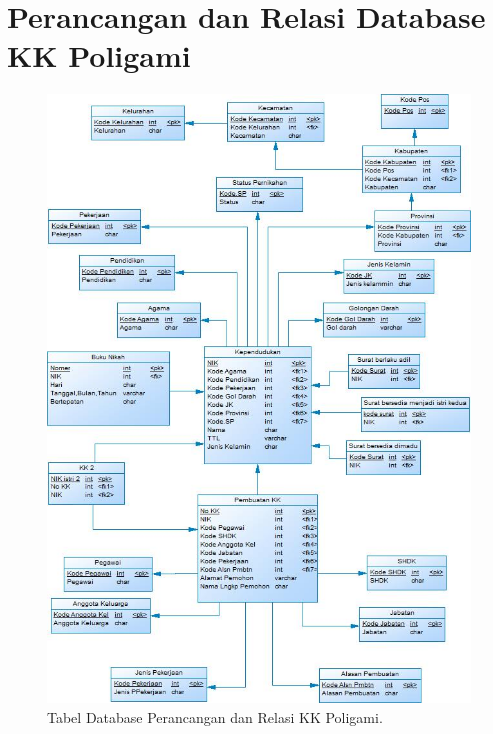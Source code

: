 \section{Perancangan dan Relasi Database KK Poligami }
\begin{figure}[H]
	\centering
	\includegraphics[width=12cm]{figures/poligami3.jpg}
	\caption{Tabel Database Perancangan dan Relasi KK Poligami.}
\end{figure}
